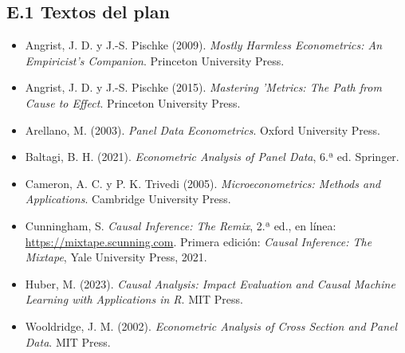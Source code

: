 \documentclass[11pt,a4paper]{article}
\begin{document}
\subsection*{E.1 Textos del plan}
{\small
\begin{itemize}[leftmargin=1.4em,itemsep=1pt,label={}]
\item Angrist, J. D. y J.-S. Pischke (2009). \emph{Mostly Harmless Econometrics: An Empiricist's Companion}. Princeton University Press.
\item Angrist, J. D. y J.-S. Pischke (2015). \emph{Mastering 'Metrics: The Path from Cause to Effect}. Princeton University Press.
\item Arellano, M. (2003). \emph{Panel Data Econometrics}. Oxford University Press.
\item Baltagi, B. H. (2021). \emph{Econometric Analysis of Panel Data}, 6.ª ed. Springer.
\item Cameron, A. C. y P. K. Trivedi (2005). \emph{Microeconometrics: Methods and Applications}. Cambridge University Press.
\item Cunningham, S. \emph{Causal Inference: The Remix}, 2.ª ed., en línea: \url{https://mixtape.scunning.com}. Primera edición: \emph{Causal Inference: The Mixtape}, Yale University Press, 2021.
\item Huber, M. (2023). \emph{Causal Analysis: Impact Evaluation and Causal Machine Learning with Applications in R}. MIT Press.
\item Wooldridge, J. M. (2002). \emph{Econometric Analysis of Cross Section and Panel Data}. MIT Press.
\end{itemize}
}
\end{document}
